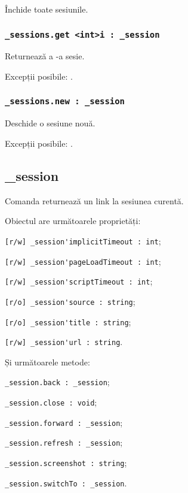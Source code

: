 Închide toate sesiunile.

\subsubsection{\lstinline|_sessions.get <int>i : _session|}

Returnează a -a sesie.

Excepții posibile: .

\subsubsection{\lstinline|_sessions.new : _session|}

Deschide o sesiune nouă.

Excepții posibile: .

\subsection{{\color{orange} \_session}}

Comanda \session{} returnează un link la sesiunea curentă.

Obiectul \session{} are următoarele proprietăți:
\begin{icItems}
	\item \lstinline|[r/w] _session'implicitTimeout : int|;
	\item \lstinline|[r/w] _session'pageLoadTimeout : int|;
	\item \lstinline|[r/w] _session'scriptTimeout : int|;
	\item \lstinline|[r/o] _session'source : string|;
	\item \lstinline|[r/o] _session'title : string|;
	\item \lstinline|[r/w] _session'url : string|.
\end{icItems}

Și următoarele metode:
\begin{icItems}
	\item \lstinline|_session.back : _session|;
	\item \lstinline|_session.close : void|;
	\item \lstinline|_session.forward : _session|;
	\item \lstinline|_session.refresh : _session|;
	\item \lstinline|_session.screenshot : string|;
	\item \lstinline|_session.switchTo : _session|.
\end{icItems}

